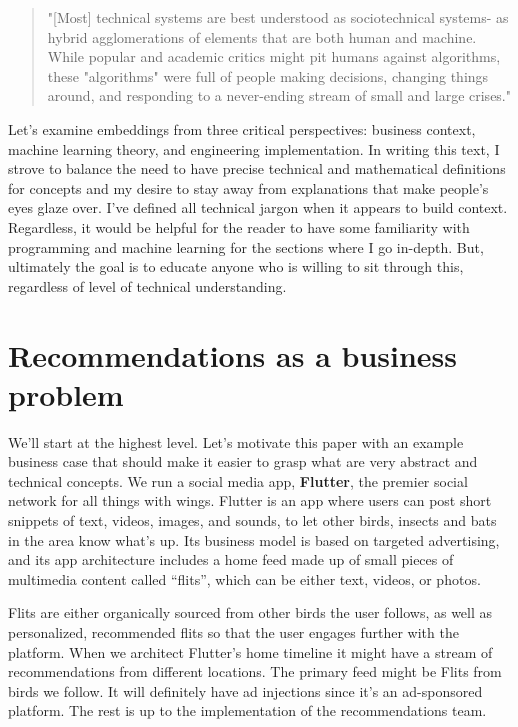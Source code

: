 \documentclass[11pt]{diazessay} %
\begin{document}
\begin{quote}
"[Most] technical systems are best understood as sociotechnical systems- as hybrid agglomerations of elements that are both human and machine. While popular and academic critics might pit humans against algorithms, these "algorithms" were full of people making decisions, changing things around, and responding to a never-ending stream of small and large crises."
\end{quote}

Let's examine embeddings from three critical perspectives: business context, machine learning theory, and engineering implementation. In writing this text, I strove to balance the need to have precise technical and mathematical definitions for concepts and my desire to stay away from explanations that make people's eyes glaze over. I've defined all technical jargon when it appears to build context. Regardless, it would be helpful for the reader to have some familiarity with programming and machine learning for the sections where I go in-depth. But, ultimately the goal is to educate anyone who is willing to sit through this, regardless of level of technical understanding. 


\section{Recommendations as a business problem}

We'll start at the highest level. Let's motivate this paper with an example business case that should make it easier to grasp what are very abstract and technical concepts. We run a social media app, \textbf{Flutter}, the premier social network for all things with wings. Flutter is an app where users can post short snippets of text, videos, images, and sounds, to let other birds, insects and bats in the area know what’s up. Its business model is based on targeted advertising, and its app architecture includes a home feed made up of small pieces of multimedia content called “flits”, which can be either text, videos, or photos. 

Flits are either organically sourced from other birds the user follows, as well as personalized, recommended flits so that the user engages further with the platform. When we architect Flutter’s home timeline  it might have a stream of recommendations from different locations. The primary feed might be Flits from birds we follow. It will definitely have ad injections since it's an ad-sponsored platform. The rest is up to the implementation of the recommendations team.
\end{document}
